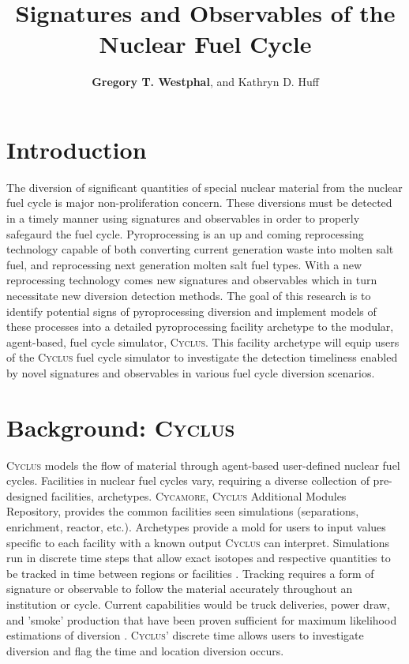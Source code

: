 \documentclass{anstrans}
\title{Signatures and Observables of the Nuclear Fuel Cycle}
\author{\textbf{Gregory T. Westphal}, and Kathryn D. Huff}
\institute{
Dept. of Nuclear, Plasma and Radiological Engineering, University of Illinois at Urbana-Champaign \\
gtw2@illinois.edu
}
\newcommand{\Cyclus}{\textsc{Cyclus}\xspace}%
\newcommand{\Cycamore}{\textsc{Cycamore}\xspace}%
\begin{document}
\section{Introduction}
The diversion of significant quantities of special nuclear material from the nuclear fuel cycle is major non-proliferation concern. These diversions must be detected in a timely manner using signatures and observables in order to properly safegaurd the fuel cycle. Pyroprocessing is an up and coming reprocessing technology capable of both converting current generation waste into molten salt fuel, and reprocessing next generation molten salt fuel types. With a new reprocessing technology comes new signatures and observables which in turn necessitate new diversion detection methods. The goal of this research is to identify potential signs of pyroprocessing diversion and implement models of these processes into a detailed pyroprocessing facility archetype to the modular, agent-based, fuel cycle simulator, \Cyclus. This facility archetype will equip users of the \Cyclus fuel cycle simulator to investigate the detection timeliness enabled by novel signatures and observables in various fuel cycle diversion scenarios.

\section{Background: \Cyclus}
\Cyclus models the flow of material through agent-based user-defined nuclear fuel cycles. Facilities in nuclear fuel cycles vary, requiring a diverse collection of pre-designed facilities, archetypes. \Cycamore, \Cyclus Additional Modules Repository, provides the common facilities seen simulations (separations, enrichment, reactor, etc.). Archetypes provide a mold for users to input values specific to each facility with a known output \Cyclus can interpret. Simulations run in discrete time steps that allow exact isotopes and respective quantities to be tracked in time between regions or facilities \cite{huff_fundamental_2016}. Tracking requires a form of signature or observable to follow the material accurately throughout an institution or cycle. Current capabilities would be truck deliveries, power draw, and 'smoke' production that have been proven sufficient for maximum likelihood estimations of diversion \cite{Hou_2016,Yilmaz_2016}.
\Cyclus' discrete time allows users to investigate diversion and flag the time and location diversion occurs.
\end{document}
